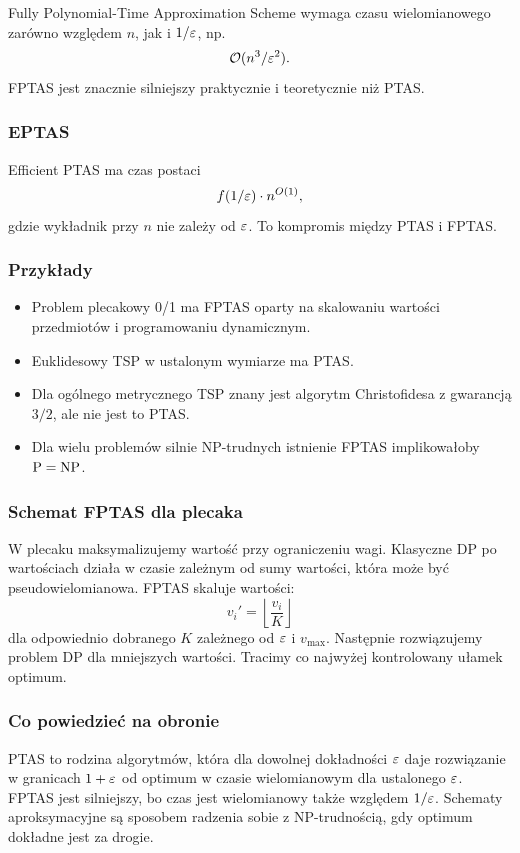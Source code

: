 Fully Polynomial-Time Approximation Scheme wymaga czasu wielomianowego zarówno względem $n$, jak i $1/\varepsilon$, np.
\[
\mathcal{O}(n^3/\varepsilon^2).
\]
FPTAS jest znacznie silniejszy praktycznie i teoretycznie niż PTAS.

\subsubsection{EPTAS}

Efficient PTAS ma czas postaci
\[
f(1/\varepsilon)\cdot n^{O(1)},
\]
gdzie wykładnik przy $n$ nie zależy od $\varepsilon$. To kompromis między PTAS i FPTAS.

\subsubsection{Przykłady}

\begin{itemize}
  \item Problem plecakowy 0/1 ma FPTAS oparty na skalowaniu wartości przedmiotów i programowaniu dynamicznym.
  \item Euklidesowy TSP w ustalonym wymiarze ma PTAS.
  \item Dla ogólnego metrycznego TSP znany jest algorytm Christofidesa z gwarancją $3/2$, ale nie jest to PTAS.
  \item Dla wielu problemów silnie NP-trudnych istnienie FPTAS implikowałoby $\mathrm{P}=\mathrm{NP}$.
\end{itemize}

\subsubsection{Schemat FPTAS dla plecaka}

W plecaku maksymalizujemy wartość przy ograniczeniu wagi. Klasyczne DP po wartościach działa w czasie zależnym od sumy wartości, która może być pseudowielomianowa. FPTAS skaluje wartości:
\[
v_i'=\left\lfloor \frac{v_i}{K}\right\rfloor
\]
dla odpowiednio dobranego $K$ zależnego od $\varepsilon$ i $v_{\max}$. Następnie rozwiązujemy problem DP dla mniejszych wartości. Tracimy co najwyżej kontrolowany ułamek optimum.

\subsubsection{Co powiedzieć na obronie}

PTAS to rodzina algorytmów, która dla dowolnej dokładności $\varepsilon$ daje rozwiązanie w granicach $1+\varepsilon$ od optimum w czasie wielomianowym dla ustalonego $\varepsilon$. FPTAS jest silniejszy, bo czas jest wielomianowy także względem $1/\varepsilon$. Schematy aproksymacyjne są sposobem radzenia sobie z NP-trudnością, gdy optimum dokładne jest za drogie.

